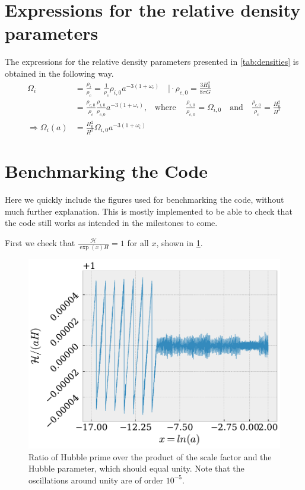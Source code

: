 \documentclass[10pt,a4paper]{article}
\providecommand{\qwhere}
{
    \ensuremath{
    ,\quad \text{where} \quad 
    }
}
\begin{document}
\clearpage
\begin{appendices}
\appendix
\section{Expressions for the relative density parameters}
\label{asec:density_params}
The expressions for the relative density parameters presented in \cref{tab:densities} is obtained in the following way.
\begin{align*}
    \Omega_i & = \frac{\rho_i}{\rho_c} = \frac{1}{\rho_c} \rho_{i,0} a^{-3(1+\omega_i)} \quad \bigg\rvert \cdot \rho_{c,0} = \frac{3H_0^2}{8\pi G}
    \\
    & = \frac{\rho_{c,0}}{\rho_c} \frac{\rho_{i,0}}{\rho_{c,0}} a^{-3(1+\omega_i)} \qwhere \frac{\rho_{i,0}}{\rho_{c,0}} = \Omega_{i,0} \quad \text{and} \quad \frac{\rho_{c,0}}{\rho_c} = \frac{H_0^2}{H^2}
    \\
    \Rightarrow \Omega_i (a) & = \frac{H_0^2}{H^2} \Omega_{i,0} a^{-3(1+\omega_i)} 
\end{align*}

\section{Benchmarking the Code}
\label{asec:Benchmarking}
Here we quickly include the figures used for benchmarking the code, without much further explanation. This is mostly implemented to be able to check that the code still works as intended in the milestones to come.

First we check that $\frac{\mathcal{H}}{\exp(x)H} =1$ for all $x$, shown in \cref{fig:bench_Hp_over_aH}.
\begin{figure}[ht]
    \centering
    \includegraphics[scale=0.5]{../figs/ratio_Hprime_aH.pdf}
    \caption{Ratio of Hubble prime over the product of the scale factor and the Hubble parameter, which should equal unity. Note that the oscillations around unity are of order $10^{-5}$.}
    \label{fig:bench_Hp_over_aH}
\end{figure}


\end{appendices}
\end{document}
